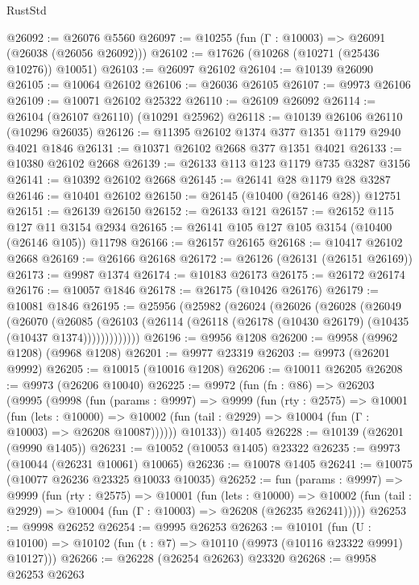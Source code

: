 \begin{lexlean}{RustStd}
\begin{coremodule}
@26092 := @26076 @5560
@26097 := @10255 (fun (Γ : @10003) => @26091 (@26038 (@26056 @26092)))
@26102 := @17626 (@10268 (@10271 (@25436 @10276)) @10051)
@26103 := @26097 @26102
@26104 := @10139 @26090
@26105 := @10064 @26102
@26106 := @26036 @26105
@26107 := @9973 @26106
@26109 := @10071 @26102 @25322
@26110 := @26109 @26092
@26114 := @26104 (@26107 @26110) (@10291 @25962)
@26118 := @10139 @26106 @26110 (@10296 @26035)
@26126 := @11395 @26102 @1374 @377 @1351 @1179 @2940 @4021 @1846
@26131 := @10371 @26102 @2668 @377 @1351 @4021
@26133 := @10380 @26102 @2668
@26139 := @26133 @113 @123 @1179 @735 @3287 @3156
@26141 := @10392 @26102 @2668
@26145 := @26141 @28 @1179 @28 @3287
@26146 := @10401 @26102
@26150 := @26145 (@10400 (@26146 @28)) @12751
@26151 := @26139 @26150
@26152 := @26133 @121
@26157 := @26152 @115 @127 @11 @3154 @2934
@26165 := @26141 @105 @127 @105 @3154 (@10400 (@26146 @105)) @11798
@26166 := @26157 @26165
@26168 := @10417 @26102 @2668
@26169 := @26166 @26168
@26172 := @26126 (@26131 (@26151 @26169))
@26173 := @9987 @1374
@26174 := @10183 @26173
@26175 := @26172 @26174
@26176 := @10057 @1846
@26178 := @26175 (@10426 @26176)
@26179 := @10081 @1846
@26195 := @25956
    (@25982
      (@26024
        (@26026
          (@26028
            (@26049
              (@26070
                (@26085
                  (@26103 (@26114 (@26118 (@26178 (@10430 @26179) (@10435 (@10437 @1374)))))))))))))
@26196 := @9956 @1208
@26200 := @9958 (@9962 @1208) (@9968 @1208)
@26201 := @9977 @23319
@26203 := @9973 (@26201 @9992)
@26205 := @10015 (@10016 @1208)
@26206 := @10011 @26205
@26208 := @9973 (@26206 @10040)
@26225 := @9972
    (fun (fn : @86) =>
    @26203
      (@9995
        (@9998
          (fun (params : @9997) =>
          @9999
            (fun (rty : @2575) =>
            @10001
              (fun (lets : @10000) =>
              @10002 (fun (tail : @2929) => @10004 (fun (Γ : @10003) => @26208 @10087))))))
        @10133))
    @1405
@26228 := @10139 (@26201 (@9990 @1405))
@26231 := @10052 (@10053 @1405) @23322
@26235 := @9973 (@10044 (@26231 @10061) @10065)
@26236 := @10078 @1405
@26241 := @10075 (@10077 @26236 @23325 @10033 @10035)
@26252 := fun (params : @9997) =>
  @9999
    (fun (rty : @2575) =>
    @10001
      (fun (lets : @10000) =>
      @10002 (fun (tail : @2929) => @10004 (fun (Γ : @10003) => @26208 (@26235 @26241)))))
@26253 := @9998 @26252
@26254 := @9995 @26253
@26263 := @10101
    (fun (U : @10100) => @10102 (fun (t : @7) => @10110 (@9973 (@10116 @23322 @9991) @10127)))
@26266 := @26228 (@26254 @26263) @23320
@26268 := @9958 @26253 @26263

\end{coremodule}
\end{lexlean}
